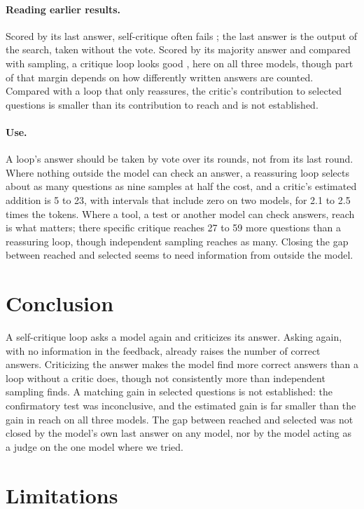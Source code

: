 \documentclass[11pt]{article}
\begin{document}
\paragraph{Reading earlier results.}
Scored by its last answer, self-critique often fails \citep{huang2024cannot,stechly2024selfverification}; the last answer is the output of the search, taken without the vote.
Scored by its majority answer and compared with sampling, a critique loop looks good \citep{bilal2026refining}, here on all three models, though part of that margin depends on how differently written answers are counted.
Compared with a loop that only reassures, the critic's contribution to selected questions is smaller than its contribution to reach and is not established.

\paragraph{Use.}
A loop's answer should be taken by vote over its rounds, not from its last round.
Where nothing outside the model can check an answer, a reassuring loop selects about as many questions as nine samples at half the cost, and a critic's estimated addition is 5 to 23, with intervals that include zero on two models, for 2.1 to 2.5 times the tokens.
Where a tool, a test or another model can check answers, reach is what matters; there specific critique reaches 27 to 59 more questions than a reassuring loop, though independent sampling reaches as many.
Closing the gap between reached and selected seems to need information from outside the model.

\section{Conclusion}

A self-critique loop asks a model again and criticizes its answer.
Asking again, with no information in the feedback, already raises the number of correct answers.
Criticizing the answer makes the model find more correct answers than a loop without a critic does, though not consistently more than independent sampling finds.
A matching gain in selected questions is not established: the confirmatory test was inconclusive, and the estimated gain is far smaller than the gain in reach on all three models.
The gap between reached and selected was not closed by the model's own last answer on any model, nor by the model acting as a judge on the one model where we tried.

\section*{Limitations}
\end{document}
